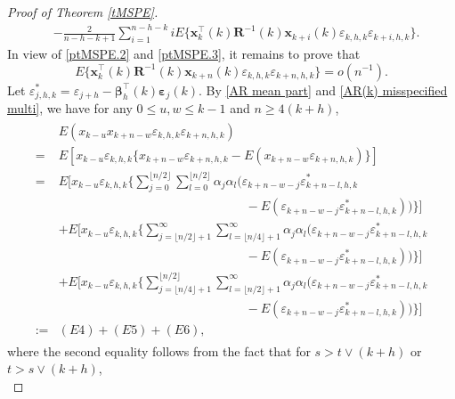 \documentclass[ejsv2]{imsart}
\theoremstyle{plain}
\theoremstyle{definition}
\theoremstyle{remark}
\begin{document}
\begin{proof}[Proof of Theorem \ref{tMSPE}]
{\begin{equation}
\begin{split}
   &-\frac{2}{n-h-k+1}\sum_{i=1}^{n-h-k}iE\{\mathbf{x}_k^\top(k)\mathbf{R}^{-1}(k)\mathbf{x}_{k+i}(k)\varepsilon_{k,h,k}\varepsilon_{k+i,h,k}\}.
\end{split}
\end{equation}
In view of \eqref{ptMSPE.2} and \eqref{ptMSPE.3}, it remains to prove that
\begin{equation}\label{ptMSPE.9}
E\{\mathbf{x}_k^\top(k)\mathbf{R}^{-1}(k)\mathbf{x}_{k+n}(k)\varepsilon_{k,h,k}\varepsilon_{k+n,h,k}\}=o(n^{-1}).
\end{equation}
Let $\varepsilon^\ast_{j,h,k}=\varepsilon_{j+h}-\bm{\beta}_h^\top(k)\bm{\varepsilon}_{j}(k)$. By \eqref{AR mean part} and \eqref{AR(k) misspecified multi}, we have for any $0\leq u,w\leq k-1$ and $n\geq4(k+h)$,
\begin{align}\label{ptMSPE.4}
\begin{split}
     & E(x_{k-u}x_{k+n-w}\varepsilon_{k,h,k}\varepsilon_{k+n,h,k}) \\
     =& E[x_{k-u}\varepsilon_{k,h,k}\{x_{k+n-w}\varepsilon_{k+n,h,k}-E(x_{k+n-w}\varepsilon_{k+n,h,k})\}]\\
     =& E[x_{k-u}\varepsilon_{k,h,k}\{\sum_{j=0}^{\lfloor n/2\rfloor}\sum_{l=0}^{\lfloor n/2\rfloor}\alpha_j\alpha_l(\varepsilon_{k+n-w-j}\varepsilon^\ast_{k+n-l,h,k}\\
     &\hspace{15em}-E(\varepsilon_{k+n-w-j}\varepsilon^\ast_{k+n-l,h,k}))\}]\\
     &+E[x_{k-u}\varepsilon_{k,h,k}\{\sum_{j=\lfloor n/2\rfloor+1}^{\infty}\sum_{l=\lfloor n/4\rfloor+1}^{\infty}\alpha_j\alpha_l(\varepsilon_{k+n-w-j}\varepsilon^\ast_{k+n-l,h,k}\\
      &\hspace{15em}-E(\varepsilon_{k+n-w-j}\varepsilon^\ast_{k+n-l,h,k}))\}]\\
     &+E[x_{k-u}\varepsilon_{k,h,k}\{\sum_{j=\lfloor n/4\rfloor+1}^{\lfloor n/2\rfloor}\sum_{l=\lfloor n/2\rfloor+1}^{\infty}\alpha_j\alpha_l(\varepsilon_{k+n-w-j}\varepsilon^\ast_{k+n-l,h,k}\\
      &\hspace{15em}-E(\varepsilon_{k+n-w-j}\varepsilon^\ast_{k+n-l,h,k}))\}]\\
     :=&(E4)+(E5)+(E6),
\end{split}
\end{align}
where the second equality follows from the fact that for $s>t\vee (k+h)$ or $t>s\vee (k+h)$,
\begin{equation}\label{ptMSPE.4.1}

\end{equation}}
\end{proof}
\end{document}
